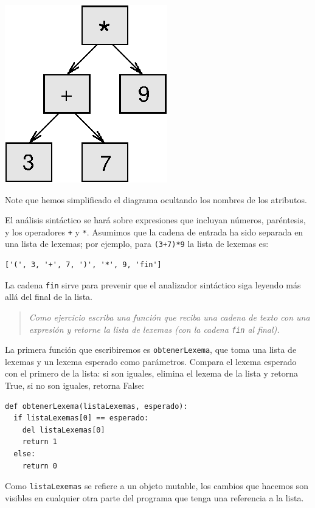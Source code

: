 \beforefig \centerline{\includegraphics{illustrations/tree3}}
\afterfig

Note que hemos simplificado el diagrama ocultando los nombres de los
atributos.

El análisis sintáctico se hará sobre expresiones que incluyan números,
paréntesis, y los operadores \texttt{+} y \texttt{{*}}. Asumimos que
la cadena de entrada ha sido separada en una lista de lexemas; por
ejemplo, para \texttt{(3+7){*}9} la lista de lexemas es:

\beforeverb 
\begin{verbatim}
['(', 3, '+', 7, ')', '*', 9, 'fin']
\end{verbatim}
\afterverb La cadena \texttt{fin} sirve para prevenir que el analizador
sintáctico siga leyendo más allá del final de la lista.
\begin{quote}
{\em Como ejercicio escriba una función que reciba una cadena de
texto con una expresión y retorne la lista de lexemas (con la cadena
\texttt{fin} al final).} 
\end{quote}
La primera función que escribiremos es \texttt{obtenerLexema}, que
toma una lista de lexemas y un lexema esperado como parámetros. Compara
el lexema esperado con el primero de la lista: si son iguales, elimina
el lexema de la lista y retorna True, si no son iguales, retorna False:

\beforeverb 
\begin{verbatim}
def obtenerLexema(listaLexemas, esperado):
  if listaLexemas[0] == esperado:
    del listaLexemas[0]
    return 1
  else:
    return 0
\end{verbatim}
\afterverb Como \texttt{listaLexemas} se refiere a un objeto mutable,
los cambios que hacemos son visibles en cualquier otra parte del programa
que tenga una referencia a la lista.

